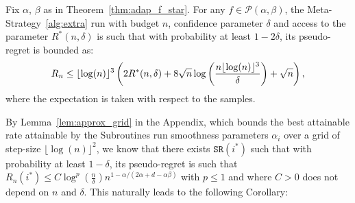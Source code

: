 \documentclass[final,12pt]{colt2018}
\newcommand{\floor}[1]{\lfloor #1 \rfloor}
\begin{document}
\begin{theorem}\label{thm:adap_rate}
Fix $\alpha$, $\beta$ as in Theorem~\ref{thm:adap_f_star}. For any $f \in \mathcal P(\alpha,\beta)$, the Meta-Strategy~\ref{alg:extra} run with budget $n$, confidence parameter $\delta$ and access to the parameter $R^*(n, \delta)$ is such that with probability at least $1-2\delta$, its pseudo-regret is bounded as:
\vspace{-0.2cm}
$$
R_n \leq \floor{\log(n)}^3\left(2R^*(n, \delta) + 8\sqrt{n}\log\left(\frac{n\floor{\log(n)}^3}{\delta}\right) + \sqrt{n}\right),
\vspace{-0.1cm}
$$
where the expectation is taken with respect to the samples.
\end{theorem}
By Lemma~\ref{lem:approx_grid} in the Appendix, which bounds the best attainable rate attainable by the Subroutines run smoothness parameters $\alpha_i$ over a grid of step-size $\floor{\log(n)}^2$, we know that there exists $\texttt{SR}(i^*)$ such that with probability at least $1-\delta$, its pseudo-regret is such that $R_n(i^*) \leq C\log^p\left(\frac{n}{\delta}\right) n^{1-\alpha/(2\alpha+d-\alpha\beta)}$ with $p \leq 1$ and where $C>0$ does not depend on $n$ and $\delta$.
This naturally leads to the following Corollary:
\end{document}
